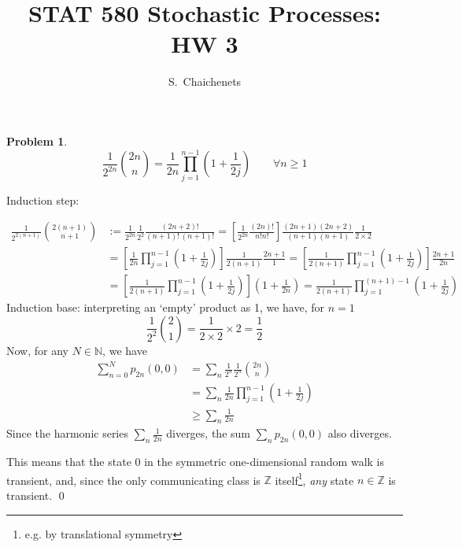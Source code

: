 \documentclass[8pt,notitlepage]{report}
\newtheorem{problem}{Problem}
\newenvironment{solution}[1][Solution]{\begin{trivlist}
    \item[\hskip \labelsep {\bfseries #1}]}{\end{trivlist}}
\begin{document}
\title{STAT 580 Stochastic Processes: HW 3}
\author{ S.\ Chaichenets }
\maketitle



\begin{problem}
\small
\begin{equation}
\frac{1}{2^{2n}} {2n \choose n} = \frac{1}{2n} \prod_{j=1}^{n-1} \left(1+\frac{1}{2j}\right)
\qquad \forall n\geq 1
\end{equation}
\normalsize
\end{problem}

\begin{solution}
Induction step:

\begin{equation}
\begin{split}
\frac{1}{2^{2(n+1)}} {2(n+1) \choose n+1} 
	& := \frac{1}{2^{2n}}\frac{1}{2^2} \frac{(2n+2)!}{(n+1)!\,(n+1)!} 
	 = \left[ \frac{1}{2^{2n}}\frac{(2n)!}{n!n!} \right]
		\frac{(2n+1)(2n+2)}{(n+1)(n+1)}\frac{1}{2\times2} 			\\
	& = \left[ \frac{1}{2n}\prod_{j=1}^{n-1} \left(1+\frac{1}{2j}\right) \right]
		\frac{1}{2(n+1)}\frac{2n+1}{1} 
	 = \left[ \frac{1}{2(n+1)}\prod_{j=1}^{n-1} \left(1+\frac{1}{2j}\right) \right]
		\frac{2n+1}{2n}								\\
	& = \left[ \frac{1}{2(n+1)}\prod_{j=1}^{n-1} \left(1+\frac{1}{2j}\right) \right]
		\left( 1 + \frac{1}{2n} \right)
	 = \frac{1}{2(n+1)}\prod_{j=1}^{(n+1)-1} \left(1+\frac{1}{2j}\right)
\end{split}
\end{equation}
Induction base: interpreting an `empty' product as 1, we have, for $n=1$
$$
\frac{1}{2^2}{2 \choose 1} = \frac{1}{2\times2} \times 2 = \frac{1}{2}
$$
Now, for any $N\in \mathbb{N}$, we have
\begin{equation}
\begin{split}
\sum_{n=0}^{N} p_{2n}(0,0) &= \sum_n \frac{1}{2^n}\frac{1}{2^n}{2n \choose n}		\\
			&= \sum_n {\frac{1}{2n} \prod_{j=1}^{n-1} \left(1+\frac{1}{2j}\right)}	\\
			&\geq	\sum_{n}\frac{1}{2n}
\end{split}
\end{equation}
Since the harmonic series $\sum_n \frac{1}{2n}$ diverges, 
the sum $\sum_{n} p_{2n}(0,0)$ also diverges.

This means that the state $0$ in the symmetric one-dimensional random walk is transient,
and, since the only communicating class is $\mathbb{Z}$ itself\footnote{
	e.g. by translational symmetry
}, {\it any} state $n\in \mathbb{Z}$ is transient.
\qed
\end{solution}
\end{document}
